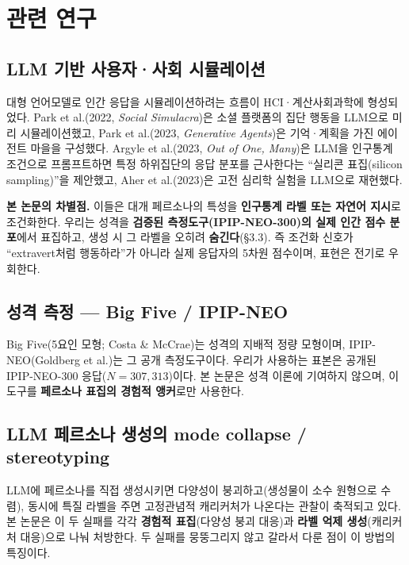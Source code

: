 \documentclass[11pt, a4paper]{article}
\begin{document}
\section{관련 연구}

\subsection{LLM 기반 사용자·사회 시뮬레이션}

대형 언어모델로 인간 응답을 시뮬레이션하려는 흐름이 HCI·계산사회과학에 형성되었다. Park et al.(2022, \textit{Social Simulacra})은 소셜 플랫폼의 집단 행동을 LLM으로 미리 시뮬레이션했고, Park et al.(2023, \textit{Generative Agents})은 기억·계획을 가진 에이전트 마을을 구성했다. Argyle et al.(2023, \textit{Out of One, Many})은 LLM을 인구통계 조건으로 프롬프트하면 특정 하위집단의 응답 분포를 근사한다는 ``실리콘 표집(silicon sampling)''을 제안했고, Aher et al.(2023)은 고전 심리학 실험을 LLM으로 재현했다.

\textbf{본 논문의 차별점.} 이들은 대개 페르소나의 특성을 \textbf{인구통계 라벨 또는 자연어 지시}로 조건화한다. 우리는 성격을 \textbf{검증된 측정도구(IPIP-NEO-300)의 실제 인간 점수 분포}에서 표집하고, 생성 시 그 라벨을 오히려 \textbf{숨긴다}(\S3.3). 즉 조건화 신호가 ``extravert처럼 행동하라''가 아니라 실제 응답자의 5차원 점수이며, 표현은 전기로 우회한다.

\subsection{성격 측정 --- Big Five / IPIP-NEO}

Big Five(5요인 모형; Costa \& McCrae)는 성격의 지배적 정량 모형이며, IPIP-NEO(Goldberg et al.)는 그 공개 측정도구이다. 우리가 사용하는 표본은 공개된 IPIP-NEO-300 응답($N=307{,}313$)이다. 본 논문은 성격 이론에 기여하지 않으며, 이 도구를 \textbf{페르소나 표집의 경험적 앵커}로만 사용한다.

\subsection{LLM 페르소나 생성의 mode collapse / stereotyping}

LLM에 페르소나를 직접 생성시키면 다양성이 붕괴하고(생성물이 소수 원형으로 수렴), 동시에 특질 라벨을 주면 고정관념적 캐리커처가 나온다는 관찰이 축적되고 있다. 본 논문은 이 두 실패를 각각 \textbf{경험적 표집}(다양성 붕괴 대응)과 \textbf{라벨 억제 생성}(캐리커처 대응)으로 나눠 처방한다. 두 실패를 뭉뚱그리지 않고 갈라서 다룬 점이 이 방법의 특징이다.
\end{document}
